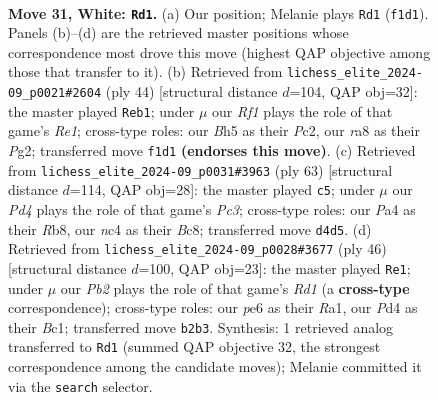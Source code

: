 \documentclass[11pt]{article}
\begin{document}
\begin{figure}[p]\centering
\begin{subfigure}{0.46\textwidth}\centering
\resizebox{\linewidth}{!}{%
\newchessgame
\chessboard[
  setfen={r1bq2k1/3pr1bp/pp2p3/2P2p1B/P1nP1Q1P/2N2N2/1P3PK1/R1B2R2 w - - 0 31},
  showmover=false,
  pgfstyle=straightmove, color=movearrow, markmove={f1-d1}
]}
\caption{}
\end{subfigure}\hfill
\begin{subfigure}{0.46\textwidth}\centering
\resizebox{\linewidth}{!}{%
\newchessgame
\chessboard[
  setfen={r3k2r/1pq1b1p1/2pp3p/4n1p1/PR1BPn2/2N3QP/B1P2PP1/4R1K1 w kq - 3 23},
  showmover=false,
  pgfstyle=straightmove, color=movearrow, markmove={e1-b1}
]}
\caption{}
\end{subfigure}
\\[4pt]
\begin{subfigure}{0.46\textwidth}\centering
\resizebox{\linewidth}{!}{%
\newchessgame
\chessboard[
  setfen={1rb1rbk1/5pp1/1qppnn1p/Np6/1P1PP2P/5NP1/1BR2P2/2R1QBK1 b - - 0 32},
  showmover=false,
  pgfstyle=straightmove, color=movearrow, markmove={c6-c5}
]}
\caption{}
\end{subfigure}\hfill
\begin{subfigure}{0.46\textwidth}\centering
\resizebox{\linewidth}{!}{%
\newchessgame
\chessboard[
  setfen={r1q1k2r/p3bpp1/4p2p/2p2b1P/1PP2Q2/P1n2N2/5PP1/R1BR1BK1 w kq - 7 24},
  showmover=false,
  pgfstyle=straightmove, color=movearrow, markmove={d1-e1}
]}
\caption{}
\end{subfigure}
\caption{\textbf{Move 31, White: \texttt{Rd1}.} (a) Our position; Melanie plays \texttt{Rd1} (\texttt{f1d1}). Panels (b)--(d) are the retrieved master positions whose correspondence most drove this move (highest QAP objective among those that transfer to it). (b) Retrieved from \texttt{lichess\_elite\_2024-09\_p0021\#2604} (ply 44) [structural distance $d$=104, QAP obj=32]: the master played \texttt{Reb1}; under $\mu$ our \emph{Rf1} plays the role of that game's \emph{Re1}; cross-type roles: our \emph{B}h5 as their \emph{P}c2, our \emph{r}a8 as their \emph{P}g2; transferred move \texttt{f1d1} \textbf{(endorses this move)}. (c) Retrieved from \texttt{lichess\_elite\_2024-09\_p0031\#3963} (ply 63) [structural distance $d$=114, QAP obj=28]: the master played \texttt{c5}; under $\mu$ our \emph{Pd4} plays the role of that game's \emph{Pc3}; cross-type roles: our \emph{P}a4 as their \emph{R}b8, our \emph{n}c4 as their \emph{B}c8; transferred move \texttt{d4d5}. (d) Retrieved from \texttt{lichess\_elite\_2024-09\_p0028\#3677} (ply 46) [structural distance $d$=100, QAP obj=23]: the master played \texttt{Re1}; under $\mu$ our \emph{Pb2} plays the role of that game's \emph{Rd1} (a \textbf{cross-type} correspondence); cross-type roles: our \emph{p}e6 as their \emph{R}a1, our \emph{P}d4 as their \emph{B}c1; transferred move \texttt{b2b3}. Synthesis: 1 retrieved analog transferred to \texttt{Rd1} (summed QAP objective 32, the strongest correspondence among the candidate moves); Melanie committed it via the \texttt{search} selector.}
\label{fig:thought-m60}
\end{figure}
\end{document}
